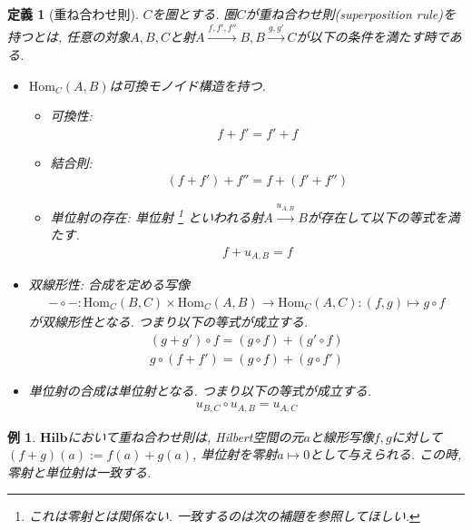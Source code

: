 \documentclass[a4paper,12pt]{ltjsarticle}
\theoremstyle{break}
\newtheorem{defn}[thm]{定義}
\newtheorem{eg}[thm]{例}
\newcommand{\hilb}{\mathbf{Hilb}}
\newcommand{\Hom}{\mathrm{Hom}}
\newcommand{\xr}[1]{\xrightarrow{#1}}
\newcommand{\ci}{\circ}
\newcommand{\mt}{\mapsto}
\newcommand{\ti}{\times}
\numberwithin{equation}{section}
\begin{document}
\begin{defn}[重ね合わせ則]
  $C$を圏とする. 
  圏$C$が重ね合わせ則(superposition rule)を持つとは, 任意の対象$A,B,C$と射$A \xr{f,f',f''} B, B \xr{g,g'} C$が以下の条件を満たす時である.   
  \begin{itemize}
  \item $\Hom_C(A,B)$は可換モノイド構造を持つ. 
  \begin{itemize}
    \item 可換性: \begin{align*} f+f'=f'+f \end{align*}
    \item 結合則: \begin{align*} (f+f')+f''=f+(f'+f'') \end{align*}
    \item 単位射の存在: 単位射
    \footnote{
      これは零射とは関係ない. 一致するのは次の補題を参照してほしい. 
      }
    といわれる射$A \xr{u_{A,B}} B$が存在して以下の等式を満たす. 
    \begin{align*} f+u_{A,B}=f \end{align*}
  \end{itemize}
  \item 双線形性: 合成を定める写像
    \begin{align*} 
      - \ci -: \Hom_C(B,C) \ti \Hom_C(A,B) \to \Hom_C(A,C): (f,g) \mapsto g \ci f 
    \end{align*}
    が双線形性となる. 
    つまり以下の等式が成立する. 
    \begin{align*}
      (g+g') \ci f=(g \ci f)+(g' \ci f) \\ 
      g \ci (f+f')=(g \ci f)+(g \ci f') 
    \end{align*}
  \item 単位射の合成は単位射となる. 
  つまり以下の等式が成立する. 
    \begin{align*} 
      u_{B,C} \ci u_{A,B} = u_{A,C} 
    \end{align*}
  \end{itemize}
\end{defn}  

\begin{eg}
  $\hilb$において重ね合わせ則は, Hilbert空間の元$a$と線形写像$f,g$に対して$(f+g)(a):=f(a)+g(a)$, 単位射を零射$a \mt 0$として与えられる.  
  この時, 零射と単位射は一致する. 
\end{eg}  

\end{document}
